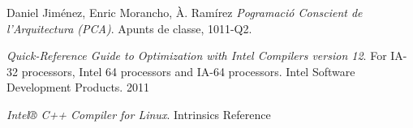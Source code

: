 \documentclass[final,a4paper,11pt,catalan]{report}
\begin{document}


\tableofcontents
\newpage









\begin{thebibliography}{9}

  Daniel Jiménez, Enric Morancho, À. Ramírez
  \emph{Pogramació Conscient de l'Arquitectura (PCA)}.
  Apunts de classe,
  1011-Q2.

  \emph{Quick-Reference Guide to Optimization with Intel Compilers version 12}. For IA-32 processors, Intel 64 processors and IA-64 processors. Intel Software Development Products. 2011

  \emph{Intel® C++ Compiler for Linux}. Intrinsics Reference

\end{thebibliography}
\end{document}
